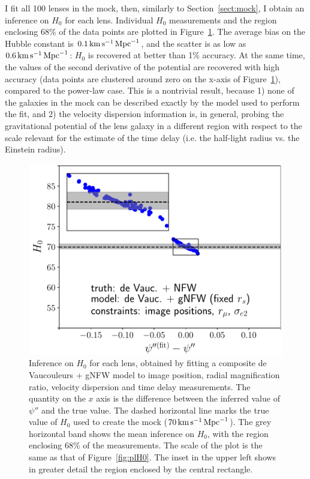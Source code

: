 \documentclass[usenatbib]{mnras}
\def\psiii{\psi''}
\def\Hunit{\,\rm{km}\,{s}^{-1}\,\rm{Mpc}^{-1}}
\def\Sref#1{Section~\ref{#1}\xspace}
\def\Fref#1{Figure~\ref{#1}\xspace}
\begin{document}
I fit all 100 lenses in the mock, then, similarly to \Sref{sect:mock}, I obtain an inference on $H_0$ for each lens.
Individual $H_0$ measurements and the region enclosing 68\% of the data points are plotted in \Fref{fig:gnfw_indH0}.
The average bias on the Hubble constant is $0.1\Hunit$, and the scatter is as low as $0.6\Hunit$: $H_0$ is recovered at better than 1\% accuracy.
At the same time, the values of the second derivative of the potential are recovered with high accuracy (data points are clustered around zero on the x-axis of \Fref{fig:gnfw_indH0}), compared to the power-law case.
This is a nontrivial result, because 1) none of the galaxies in the mock can be described exactly by the model used to perform the fit, and 2) the velocity dispersion information is, in general, probing the gravitational potential of the lens galaxy in a different region with respect to the scale relevant for the estimate of the time delay (i.e. the half-light radius vs. the Einstein radius).
%
\begin{figure}
 \includegraphics[width=\columnwidth]{gnfw_individual_H0.pdf}
 \caption{Inference on $H_0$ for each lens, obtained by fitting a composite de Vaucouleurs + gNFW model to image position, radial magnification ratio, velocity dispersion and time delay measurements.
The quantity on the $x$ axis is the difference between the inferred value of $\psiii$ and the true value. The dashed horizontal line marks the true value of $H_0$ used to create the mock ($70\,\rm{km}\,\rm{s}^{-1}\,\rm{Mpc}^{-1}$).
The grey horizontal band shows the mean inference on $H_0$, with the region enclosing 68\% of the measurements.
The scale of the plot is the same as that of \Fref{fig:plH0}. The inset in the upper left shows in greater detail the region enclosed by the central rectangle.
}
 \label{fig:gnfw_indH0}
\end{figure}
%
\end{document}
